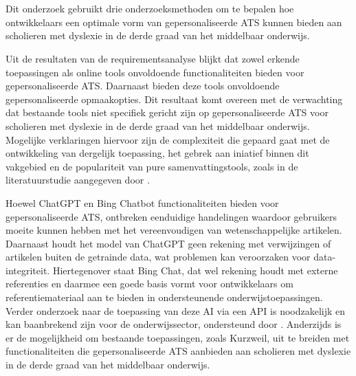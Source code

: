 
\chapter{}%
\label{ch:discussie}

Dit onderzoek gebruikt drie onderzoeksmethoden om te bepalen hoe ontwikkelaars een optimale vorm van gepersonaliseerde ATS kunnen bieden aan scholieren met dyslexie in de derde graad van het middelbaar onderwijs.

\medspace

Uit de resultaten van de requirementsanalyse blijkt dat zowel erkende toepassingen als online tools onvoldoende functionaliteiten bieden voor gepersonaliseerde ATS. Daarnaast bieden deze tools onvoldoende gepersonaliseerde opmaakopties. Dit resultaat komt overeen met de verwachting dat bestaande tools niet specifiek gericht zijn op gepersonaliseerde ATS voor scholieren met dyslexie in de derde graad van het middelbaar onderwijs. Mogelijke verklaringen hiervoor zijn de complexiteit die gepaard gaat met de ontwikkeling van dergelijk toepassing, het gebrek aan iniatief binnen dit vakgebied en de populariteit van pure samenvattingstools, zoals in de literatuurstudie aangegeven door \textcite{Gooding2022}.

\medspace

Hoewel ChatGPT en Bing Chatbot functionaliteiten bieden voor gepersonaliseerde ATS, ontbreken eenduidige handelingen waardoor gebruikers moeite kunnen hebben met het vereenvoudigen van wetenschappelijke artikelen. Daarnaast houdt het model van ChatGPT geen rekening met verwijzingen of artikelen buiten de getrainde data, wat problemen kan veroorzaken voor data-integriteit. Hiertegenover staat Bing Chat, dat wel rekening houdt met externe referenties en daarmee een goede basis vormt voor ontwikkelaars om referentiemateriaal aan te bieden in ondersteunende onderwijstoepassingen. Verder onderzoek naar de toepassing van deze AI via een API is noodzakelijk en kan baanbrekend zijn voor de onderwijssector, ondersteund door \textcite{Roose2023, Garg2022}. Anderzijds is er de mogelijkheid om bestaande toepassingen, zoals Kurzweil, uit te breiden met functionaliteiten die gepersonaliseerde ATS aanbieden aan scholieren met dyslexie in de derde graad van het middelbaar onderwijs.

